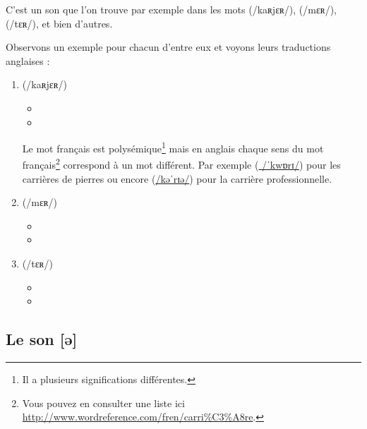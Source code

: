 C'est un son que l'on trouve par exemple dans les mots 
(/kaʀjɛʀ/),  (/mɛʀ/),  (/tɛʀ/), et bien d'autres.

Observons un exemple pour chacun d'entre eux et voyons leurs
traductions anglaises :\par

\begin{enumerate}
\item {} (/kaʀjɛʀ/)
  \begin{itemize}
  \item {}
    \item {}
    \end{itemize}
    Le mot français  est polysémique\footnote{Il a
      plusieurs significations différentes.} mais en anglais chaque
    sens du mot français\footnote{Vous pouvez en consulter une liste
      ici \url{http://www.wordreference.com/fren/carri\%C3\%A8re}.}  correspond à un mot différent. Par exemple
    (\href{https://en.oxforddictionaries.com/definition/quarry}{
      /ˈkwɒrɪ/}) pour les carrières de pierres ou encore 
    (\href{https://en.oxforddictionaries.com/definition/career}{/kəˈrɪə/})
    pour la carrière professionnelle.
\item {} (/mɛʀ/)
  \begin{itemize}
  \item {}
  \item {}
  \end{itemize}

  
\item {} (/tɛʀ/)
  \begin{itemize}
  \item {}
  \item {}
  \end{itemize}
   
\end{enumerate}

\subsection{Le son [ə]}\label{subsec:əfr}

